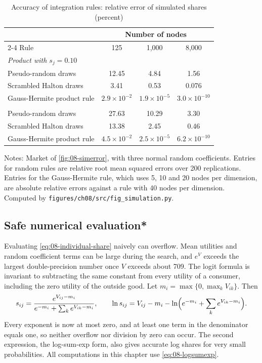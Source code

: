 \begin{table}[htbp]
\centering
\caption{Accuracy of integration rules: relative error of simulated shares (percent)}\label{tab:08-integration}
\begin{tabular}{lccc}
\toprule
 & \multicolumn{3}{c}{Number of nodes} \\
\cmidrule(lr){2-4}
Rule & 125 & 1,000 & 8,000 \\
\midrule
\multicolumn{4}{l}{\textit{Product with $s_j = 0.10$}} \\
Pseudo-random draws & 12.45 & 4.84 & 1.56 \\
Scrambled Halton draws & 3.41 & 0.53 & 0.076 \\
Gauss-Hermite product rule & $2.9 \times 10^{-2}$ & $1.9 \times 10^{-5}$ & $3.0 \times 10^{-10}$ \\
\addlinespace
\multicolumn{4}{l}{\textit{Product with $s_j = 0.005$}} \\
Pseudo-random draws & 27.63 & 10.29 & 3.30 \\
Scrambled Halton draws & 13.38 & 2.45 & 0.46 \\
Gauss-Hermite product rule & $4.5 \times 10^{-2}$ & $2.5 \times 10^{-5}$ & $6.2 \times 10^{-10}$ \\
\bottomrule
\end{tabular}

\smallskip
\begin{minipage}{0.8\linewidth}
\footnotesize Notes: Market of \cref{fig:08-simerror}, with three normal random coefficients. Entries for random rules
are relative root mean squared errors over 200 replications. Entries for the Gauss-Hermite rule, which uses 5, 10 and
20 nodes per dimension, are absolute relative errors against a rule with 40 nodes per dimension. Computed by
\texttt{figures/ch08/src/fig\_simulation.py}.
\end{minipage}
\end{table}

\subsection{Safe numerical evaluation*}\label{sec:08-overflow}

Evaluating \eqref{eq:08-individual-share} naively can overflow. Mean utilities and random coefficient terms can be
large during the search, and $e^{V}$ exceeds the largest double-precision number once $V$ exceeds about 709. The
logit formula is invariant to subtracting the same constant from every utility of a consumer, including the zero
utility of the outside good. Let $m_i = \max\{0, \max_k V_{ik}\}$. Then
\begin{equation}\label{eq:08-logsumexp}
  s_{ij} = \frac{e^{V_{ij} - m_i}}{e^{-m_i} + \sum_k e^{V_{ik} - m_i}}, \qquad
  \ln s_{ij} = V_{ij} - m_i - \ln\Bigl(e^{-m_i} + \sum_k e^{V_{ik} - m_i}\Bigr).
\end{equation}
Every exponent is now at most zero, and at least one term in the denominator equals one, so neither overflow nor
division by zero can occur. The second expression, the log-sum-exp form, also gives accurate log shares for very
small probabilities. All computations in this chapter use \eqref{eq:08-logsumexp}.
